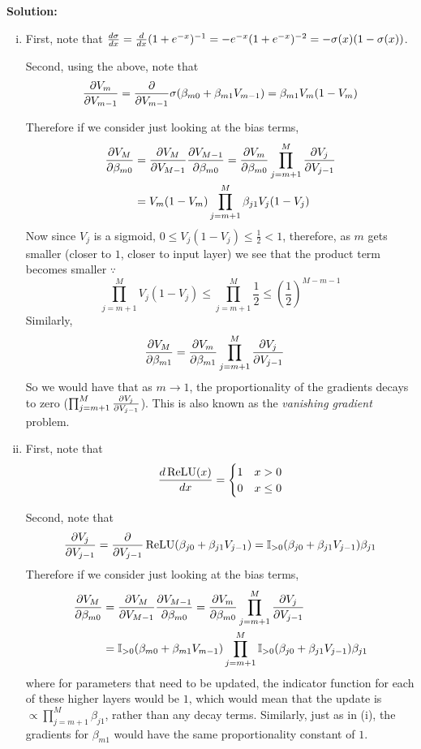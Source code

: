 \textbf{Solution:}

\begin{enumerate}[(i)]
    \item First, note that $\odv{\sigma}{x} = \odv{}{x} (1 + e^{-x})^{-1} = -e^{-x}(1 + e^{-x})^{-2} = -\sigma(x)(1 - \sigma(x))$. 
    
    Second, using the above, note that $$\pdv{V_m}{V_{m-1}} = \pdv{}{V_{m-1}} \sigma(\beta_{m0} + \beta_{m1} V_{m-1}) = \beta_{m1} V_m ( 1 - V_m)$$
    
    Therefore if we consider just looking at the bias terms,
    \begin{align*}
        \pdv{V_M}{\beta_{m0}} &= \pdv{V_M}{V_{M-1}}\pdv{V_{M-1}}{\beta_{m0}} 
             = \pdv{V_m}{\beta_{m0}}\prod_{j=m+1}^M \pdv{V_j}{V_{j-1}}\\
            &= V_m( 1 - V_m) \prod_{j=m+1}^M \beta_{j1} V_j ( 1 - V_j )
    \end{align*}
    Now since $V_j$ is a sigmoid, $ 0 \leq V_j(1 - V_j) \leq \frac{1}{2} < 1$, therefore, as $m$ gets smaller (closer to $1$, closer to input layer) we see that the product term becomes smaller $\because$
    \begin{equation*}
        \prod_{j=m+1}^M V_j ( 1 - V_j) \leq \prod_{j=m+1}^M \frac{1}{2} \leq \left(\frac{1}{2}\right)^{M - m - 1}
    \end{equation*}
    Similarly, 
    \begin{align*}
        \pdv{V_M}{\beta_{m1}} &= \pdv{V_m}{\beta_{m1}} \prod_{j=m+1}^M \pdv{V_j}{V_{j-1}}
    \end{align*}
    So we would have that as $m \rightarrow 1$, the proportionality of the gradients decays to zero ($\prod_{j=m+1}^M \pdv{V_j}{V_{j-1}}$). This is also known as the \emph{vanishing gradient} problem.
    
    \item First, note that $$\odv{\relu(x)}{x} = \begin{cases} 1 & x > 0\\ 0 & x \leq 0 \end{cases}$$
    
    Second, note that
    $$
    \pdv{V_j}{V_{j-1}} = \pdv{}{V_{j-1}} \relu(\beta_{j0} + \beta_{j1} V_{j-1}) = \mathbb{I}_{>0}(\beta_{j0} + \beta_{j1}V_{j-1}) \beta_{j1}
    $$
    Therefore if we consider just looking at the bias terms,
    \begin{align*}
        \pdv{V_M}{\beta_{m0}} &= \pdv{V_M}{V_{M-1}}\pdv{V_{M-1}}{\beta_{m0}} 
             = \pdv{V_m}{\beta_{m0}}\prod_{j=m+1}^M \pdv{V_j}{V_{j-1}}\\
             &= \mathbb{I}_{> 0}(\beta_{m0} + \beta_{m1}V_{m-1})\prod_{j=m+1}^M  \mathbb{I}_{>0}(\beta_{j0} + \beta_{j1}V_{j-1}) \beta_{j1}
    \end{align*}
    where for parameters that need to be updated, the indicator function for each of these higher layers would be $1$, which would mean that the update is $\propto \prod_{j=m+1}^M \beta_{j1}$, rather than any decay terms. Similarly, just as in (i), the gradients for $\beta_{m1}$ would have the same proportionality constant of $1$.
    

\end{enumerate}
